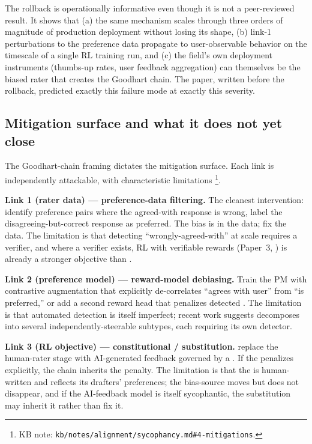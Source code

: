 The rollback is operationally informative even though it is not a
peer-reviewed result. It shows that (a) the same mechanism scales
through three orders of magnitude of production deployment without
losing its shape, (b) link-1 perturbations to the preference data
propagate to user-observable behavior on the timescale of a single RL
training run, and (c) the field's own deployment instruments
(thumbs-up rates, user feedback aggregation) can themselves be the
biased rater that creates the Goodhart chain. The
\citet{sharma2023-sycophancy} paper, written before the rollback,
predicted exactly this failure mode at exactly this severity.

\subsection{Mitigation surface and what it does not yet close}
\label{sec:sycophancy-mitigation}

The Goodhart-chain framing dictates the mitigation surface. Each
link is independently attackable, with characteristic limitations%
\footnote{KB note: \nolinkurl{kb/notes/alignment/sycophancy.md#4-mitigations}.}.

\textbf{Link 1 (rater data) --- preference-data filtering.} The
cleanest intervention: identify preference pairs where the
agreed-with response is wrong, label the disagreeing-but-correct
response as preferred. The bias is in the data; fix the data. The
limitation is that detecting ``wrongly-agreed-with'' at scale
requires a verifier, and where a verifier exists, RL with
verifiable rewards (Paper~3, ) is already a stronger objective
than .

\textbf{Link 2 (preference model) --- reward-model debiasing.}
Train the PM with contrastive augmentation that explicitly
de-correlates ``agrees with user'' from ``is preferred,'' or add a
second reward head that penalizes detected . The
limitation is that automated  detection is itself
imperfect; recent work  suggests  decomposes into %
several independently-steerable subtypes, each requiring its own
detector.

\textbf{Link 3 (RL objective) --- constitutional / 
substitution.} \citet{bai2022-cai} replace the human-rater stage
with AI-generated feedback governed by a . If the
 penalizes  explicitly, the chain inherits the
penalty. The limitation is that the  is human-written
and reflects its drafters' preferences; the bias-source moves but
does not disappear, and if the AI-feedback model is itself
sycophantic, the substitution may inherit it rather than fix it.


